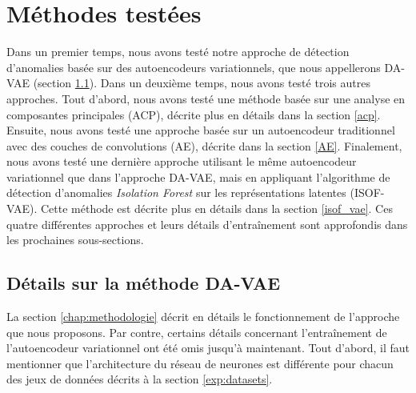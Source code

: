 \section{Méthodes testées} \label{exp:methods}

Dans un premier temps, nous avons testé notre approche de détection d'anomalies basée sur des autoencodeurs variationnels, que nous appellerons DA-VAE (section \ref{DA_VAE}). Dans un deuxième temps, nous avons testé trois autres approches. Tout d'abord, nous avons testé une méthode basée sur une analyse en composantes principales (ACP), décrite plus en détails dans la section \ref{acp}. Ensuite, nous avons testé une approche basée sur un autoencodeur traditionnel avec des couches de convolutions (AE), décrite dans la section \ref{AE}. Finalement, nous avons testé une dernière approche utilisant le même autoencodeur variationnel que dans l'approche DA-VAE, mais en appliquant l'algorithme de détection d'anomalies \textit{Isolation Forest} \citep{4781136} sur les représentations latentes (ISOF-VAE). Cette méthode est décrite plus en détails dans la section \ref{isof_vae}. Ces quatre différentes approches et leurs détails d'entraînement sont approfondis dans les prochaines sous-sections.

\subsection{Détails sur la méthode DA-VAE} \label{DA_VAE}

La section \ref{chap:methodologie} décrit en détails le fonctionnement de l'approche que nous proposons. Par contre, certains détails concernant l'entraînement de l'autoencodeur variationnel ont été omis jusqu'à maintenant. Tout d'abord, il faut mentionner que l'architecture du réseau de neurones est différente pour chacun des \DIFdelbegin {}\DIFdelend \DIFaddbegin {}\DIFaddend jeux de données décrits à la section \ref{exp:datasets}.

